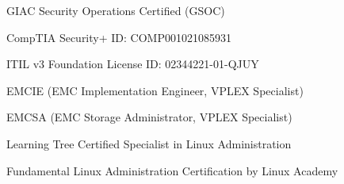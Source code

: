 
\begin{cvcerts}
  \cvcert
    {GIAC Security Operations Certified (GSOC)} %
    {} %
  
  \cvcert
    {CompTIA Security+} %
    {ID: COMP001021085931} %

  \cvcert
    {ITIL v3 Foundation} %
    {License ID: 02344221-01-QJUY} %

  \cvcert
    {EMCIE (EMC Implementation Engineer, VPLEX Specialist)} %
    {} %

  \cvcert
    {EMCSA (EMC Storage Administrator, VPLEX Specialist)} %
    {} %

  \cvcert
    {Learning Tree Certified Specialist in Linux Administration} %
    {} %

  \cvcert
    {Fundamental Linux Administration Certification by Linux Academy} %
    {} %

\end{cvcerts}
